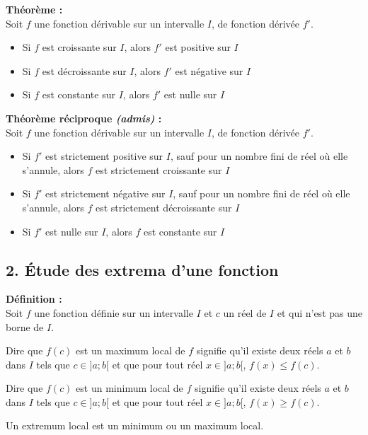 \documentclass[11pt,a4paper]{article}
\begin{document}
\begin{mdframed}[style=proprieteStyle]
    \textbf{Théorème :} ~\\
    Soit $f$ une fonction dérivable sur un intervalle $I$, de fonction dérivée $f'$.
    \begin{itemize}
        \item Si $f$ est croissante sur $I$, alors $f'$ est positive sur $I$
        \item Si $f$ est décroissante sur $I$, alors $f'$ est négative sur $I$
        \item Si $f$ est constante sur $I$, alors $f'$ est nulle sur $I$
    \end{itemize}
\end{mdframed}

\begin{mdframed}[style=proprieteStyle]
    \textbf{Théorème réciproque \emph{(admis)} :} ~\\
    Soit $f$ une fonction dérivable sur un intervalle $I$, de fonction dérivée $f'$.
    \begin{itemize}
        \item Si $f'$ est strictement positive sur $I$, sauf pour un nombre fini de réel où elle s'annule, alors $f$ est strictement croissante sur $I$
        \item Si $f'$ est strictement négative sur $I$, sauf pour un nombre fini de réel où elle s'annule, alors $f$ est strictement décroissante sur $I$
        \item Si $f'$ est nulle sur $I$, alors $f$ est constante sur $I$
    \end{itemize}
\end{mdframed}

\newpage

\subsection*{2. Étude des extrema d'une fonction}

\begin{mdframed}[style=definitionStyle]
    \textbf{Définition :} ~\\
    Soit $f$ une fonction définie sur un intervalle $I$ et $c$ un réel de $I$ et qui n'est pas une borne de $I$.

    Dire que $f(c)$ est un maximum local de $f$ signifie qu'il existe deux réels $a$ et $b$ dans $I$ tels que $c\in]a;b[$ et que pour tout réel $x\in]a;b[$, $f(x) \leq f(c)$.

    Dire que $f(c)$ est un minimum local de $f$ signifie qu'il existe deux réels $a$ et $b$ dans $I$ tels que $c\in]a;b[$ et que pour tout réel $x\in]a;b[$, $f(x) \geq f(c)$.

    Un extremum local est un minimum ou un maximum local.
\end{mdframed}
\end{document}
